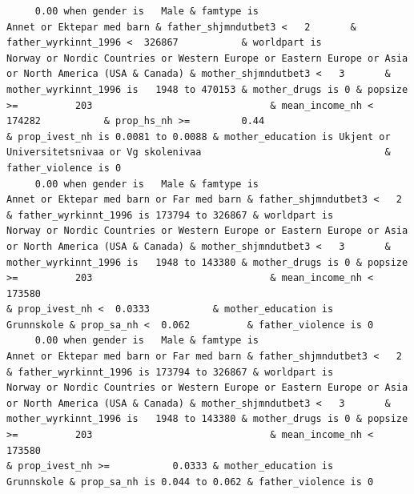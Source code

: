 \documentclass[
  letterpaper,
  DIV=11,
  numbers=noendperiod]{scrreprt}
\begin{document}
\begin{verbatim}
     0.00 when gender is   Male & famtype is                                        Annet or Ektepar med barn & father_shjmndutbet3 <   2       & father_wyrkinnt_1996 <  326867           & worldpart is                              Norway or Nordic Countries or Western Europe or Eastern Europe or Asia or North America (USA & Canada) & mother_shjmndutbet3 <   3       & mother_wyrkinnt_1996 is   1948 to 470153 & mother_drugs is 0 & popsize >=          203                               & mean_income_nh <  174282           & prop_hs_nh >=         0.44                                    & prop_ivest_nh is 0.0081 to 0.0088 & mother_education is Ukjent or Universitetsnivaa or Vg skolenivaa                                & father_violence is 0                                                                                                               
     0.00 when gender is   Male & famtype is                        Annet or Ektepar med barn or Far med barn & father_shjmndutbet3 <   2       & father_wyrkinnt_1996 is 173794 to 326867 & worldpart is                              Norway or Nordic Countries or Western Europe or Eastern Europe or Asia or North America (USA & Canada) & mother_shjmndutbet3 <   3       & mother_wyrkinnt_1996 is   1948 to 143380 & mother_drugs is 0 & popsize >=          203                               & mean_income_nh <  173580                                                                           & prop_ivest_nh <  0.0333           & mother_education is                                   Grunnskole & prop_sa_nh <  0.062          & father_violence is 0                                                                                                               
     0.00 when gender is   Male & famtype is                        Annet or Ektepar med barn or Far med barn & father_shjmndutbet3 <   2       & father_wyrkinnt_1996 is 173794 to 326867 & worldpart is                              Norway or Nordic Countries or Western Europe or Eastern Europe or Asia or North America (USA & Canada) & mother_shjmndutbet3 <   3       & mother_wyrkinnt_1996 is   1948 to 143380 & mother_drugs is 0 & popsize >=          203                               & mean_income_nh <  173580                                                                           & prop_ivest_nh >=           0.0333 & mother_education is                                   Grunnskole & prop_sa_nh is 0.044 to 0.062 & father_violence is 0                                                                                                               

\end{verbatim}
\end{document}

